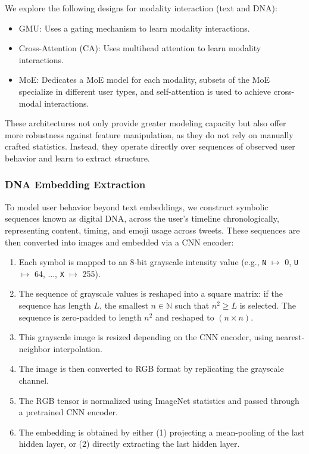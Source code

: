 \documentclass[conference]{IEEEtran}
\begin{document}
We explore the following designs for 
modality interaction (text and DNA):
\begin{itemize}
    \item GMU: Uses a gating mechanism to learn modality interactions.
    
    \item Cross-Attention (CA): Uses multihead attention to learn modality interactions.
    
    \item MoE: Dedicates a MoE model for each modality,
    subsets of the MoE specialize in different user types, 
    and self-attention is used to achieve cross-modal interactions.
\end{itemize}

These architectures not only provide greater modeling capacity
but also offer more robustness against feature manipulation, 
as they do not rely on manually crafted statistics. Instead, they operate directly over sequences of observed user behavior 
and learn to extract structure. 


\subsubsection{\textbf{DNA Embedding Extraction}}
To model user behavior beyond text embeddings, 
we construct symbolic sequences known as digital DNA, 
across the user's timeline chronologically,
representing content, timing, and emoji usage across tweets. 
These sequences are then converted into images and embedded 
via a CNN encoder:
\begin{enumerate}
    \item Each symbol is mapped to an 8-bit grayscale intensity value 
    (e.g., \texttt{N} $\mapsto$ 0, \texttt{U} $\mapsto$ 64, ..., \texttt{X} $\mapsto$ 255).
    
    \item The sequence of grayscale values is reshaped into a square matrix: 
    if the sequence has length $L$, the smallest $n \in \mathbb{N}$ such that 
    $n^2 \geq L$ is selected. The sequence is zero-padded
    to length $n^2$ and reshaped to $(n \times n)$.

    \item This grayscale image is resized depending on the CNN encoder, 
    using nearest-neighbor interpolation.
    
    \item The image is then converted to RGB format by replicating the grayscale channel.

    \item The RGB tensor is normalized using ImageNet statistics and passed through a pretrained CNN encoder. 

    \item The embedding is obtained by either (1) projecting a mean-pooling of the last hidden layer, 
    or (2) directly extracting the last hidden layer.

\end{enumerate}
\end{document}
